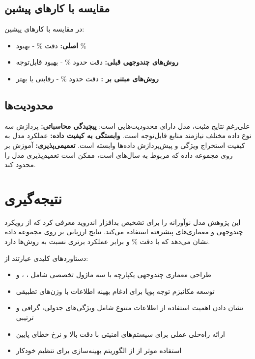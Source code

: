 \documentclass[a4paper,11pt]{article}
\begin{document}
\subsection{مقایسه با کارهای پیشین}
در مقایسه با کارهای پیشین:
\begin{itemize}
    \item \textbf{ اصلی:} دقت \% - بهبود \%
    \item \textbf{روش‌های چندوجهی قبلی:} دقت حدود \% - بهبود قابل‌توجه
    \item \textbf{روش‌های مبتنی بر :} دقت حدود \% - رقابتی یا بهتر
\end{itemize}

\subsection{محدودیت‌ها}
علی‌رغم نتایج مثبت، مدل  دارای محدودیت‌هایی است:
\textbf{پیچیدگی محاسباتی:}
پردازش سه نوع داده مختلف نیازمند منابع قابل‌توجه است.
\textbf{وابستگی به کیفیت داده:}
عملکرد مدل به کیفیت استخراج ویژگی و پیش‌پردازش داده‌ها وابسته است.
\textbf{تعمیمی‌پذیری:}
آموزش بر روی مجموعه داده  که مربوط به سال‌های  است، ممکن است تعمیم‌پذیری مدل را محدود کند.

\section{نتیجه‌گیری}
این پژوهش مدل نوآورانه  را برای تشخیص بدافزار اندروید معرفی کرد که از رویکرد چندوجهی و معماری‌های پیشرفته استفاده می‌کند. نتایج ارزیابی بر روی مجموعه داده  نشان می‌دهد که با دقت \% و  برابر  عملکرد برتری نسبت به روش‌ها دارد.

دستاوردهای کلیدی عبارتند از:
\begin{itemize}
    \item طراحی معماری چندوجهی یکپارچه با سه ماژول تخصصی شامل ، ، و 
    \item توسعه مکانیزم توجه پویا برای ادغام بهینه اطلاعات با وزن‌های تطبیقی
    \item نشان دادن اهمیت استفاده از اطلاعات متنوع شامل ویژگی‌های جدولی، گرافی و ترتیبی
    \item ارائه راه‌حلی عملی برای سیستم‌های امنیتی با دقت بالا و نرخ خطای پایین
    \item استفاده موثر از از الگوریتم بهینه‌سازی  برای تنظیم خودکار
\end{itemize}
\end{document}
